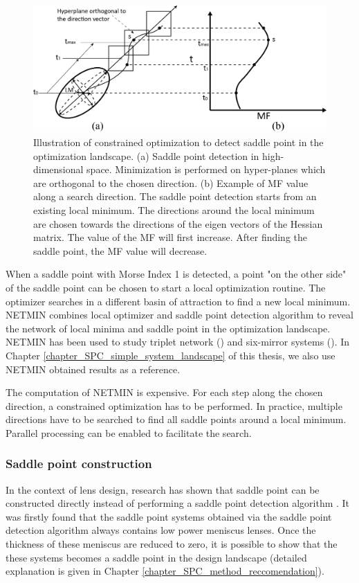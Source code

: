 \begin{figure}
    \centering
    \includegraphics[scale=0.58]{chapter-1/figures/spd_plot.png}
    \caption{Illustration of constrained optimization to detect saddle point in the optimization landscape. (a) Saddle point detection in high-dimensional space. Minimization is performed on hyper-planes which are orthogonal to the chosen direction. (b) Example of MF value along a search direction. The saddle point detection starts from an existing local minimum. The directions around the local minimum are chosen towards the directions of the eigen vectors of the Hessian matrix. The value of the MF will first increase. After finding the saddle point, the MF value will decrease. }
    \label{fig: spd_illustration}
\end{figure} 

When a saddle point with Morse Index 1 is detected, a point "on the other side" of the saddle point can be chosen to start a local optimization routine. The optimizer searches in a different basin of attraction to find a new local minimum. NETMIN combines local optimizer and saddle point detection algorithm to reveal the network of local minima and saddle point in the optimization landscape. NETMIN has been used to study triplet network (\cite{PascalTriplet2009}) and six-mirror systems (\cite{MarinescuSPD07}). In Chapter \ref{chapter_SPC_simple_system_landscape} of this thesis, we also use NETMIN obtained results as a reference. 

The computation of NETMIN is expensive. For each step along the chosen direction, a constrained optimization has to be performed. In practice, multiple directions have to be searched to find all saddle points around a local minimum. Parallel processing can be enabled to facilitate the search.  


\subsubsection{Saddle point construction }
In the context of lens design, research has shown that saddle point can be constructed directly instead of performing a saddle point detection algorithm \cite{vanTurnhoutThesis2009} \cite{MVTurnhoutSPC15}. It was firstly found that the saddle point systems obtained via the saddle point detection algorithm always contains low power meniscus lenses. Once the thickness of these meniscus are reduced to zero, it is possible to show that the these systems becomes a saddle point in the design landscape (detailed explanation is given in Chapter \ref{chapter_SPC_method_reccomendation}).

